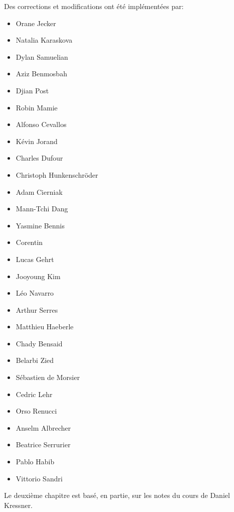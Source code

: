 \documentclass[a4paper,11pt,french]{scrbook}
\theoremstyle{plain}
\theoremstyle{definition}
\begin{document}
Des corrections et modifications ont été implémentées par: 
\begin{itemize}
\item Orane Jecker 
\item Natalia Karaskova
\item Dylan Samuelian
\item Aziz Benmosbah
\item Djian Post
\item Robin Mamie
\item Alfonso Cevallos
\item Kévin Jorand
\item Charles Dufour 
\item Christoph Hunkenschröder
\item Adam Cierniak
\item Mann-Tchi Dang
\item Yasmine Bennis
\item Corentin 
\item Lucas Gehrt
\item Jooyoung Kim 
\item Léo Navarro
\item Arthur Serres
\item Matthieu Haeberle
\item Chady Bensaid
\item Belarbi Zied
\item Sébastien de Morsier 
\item Cedric Lehr
\item Orso Renucci
\item Anselm Albrecher
\item Beatrice Serrurier
\item Pablo Habib
\item Vittorio Sandri
\end{itemize}

Le deuxième   chapitre est basé, en partie, sur les notes du cours de Daniel Kressner.  

\tableofcontents  


 








\end{document}
